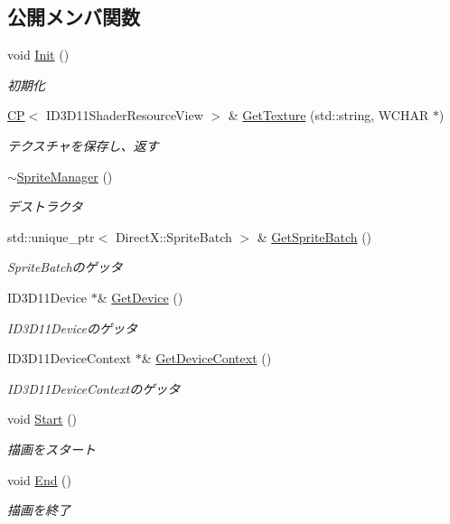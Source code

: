 \subsection*{公開メンバ関数}
\begin{DoxyCompactItemize}
\item 
void \mbox{\hyperlink{class_sprite_manager_a82941ce284548c762f250220ea58f43c}{Init}} ()
\begin{DoxyCompactList}\small\item\em 初期化 \end{DoxyCompactList}\item 
\mbox{\hyperlink{sprite__manager_8h_ab0deadee9fd38132a17560766af7fc45}{CP}}$<$ I\+D3\+D11\+Shader\+Resource\+View $>$ \& \mbox{\hyperlink{class_sprite_manager_abccd80013300704593a7bdc45aeeeb05}{Get\+Texture}} (std\+::string, W\+C\+H\+AR $\ast$)
\begin{DoxyCompactList}\small\item\em テクスチャを保存し、返す \end{DoxyCompactList}\item 
\mbox{\hyperlink{class_sprite_manager_ae01a31b1c80f676604ba55c93b499e1f}{$\sim$\+Sprite\+Manager}} ()
\begin{DoxyCompactList}\small\item\em デストラクタ \end{DoxyCompactList}\item 
std\+::unique\+\_\+ptr$<$ Direct\+X\+::\+Sprite\+Batch $>$ \& \mbox{\hyperlink{class_sprite_manager_a0b82bacf33d0b558657c8e9841daf9d9}{Get\+Sprite\+Batch}} ()
\begin{DoxyCompactList}\small\item\em Sprite\+Batchのゲッタ \end{DoxyCompactList}\item 
I\+D3\+D11\+Device $\ast$\& \mbox{\hyperlink{class_sprite_manager_ac9e2c44cc43775d9802612bd4be9bac3}{Get\+Device}} ()
\begin{DoxyCompactList}\small\item\em I\+D3\+D11\+Deviceのゲッタ \end{DoxyCompactList}\item 
I\+D3\+D11\+Device\+Context $\ast$\& \mbox{\hyperlink{class_sprite_manager_a6bad23e380818dbe6b521adc07ab84fa}{Get\+Device\+Context}} ()
\begin{DoxyCompactList}\small\item\em I\+D3\+D11\+Device\+Contextのゲッタ \end{DoxyCompactList}\item 
void \mbox{\hyperlink{class_sprite_manager_a6b387e8736713264f6d590082cd492cb}{Start}} ()
\begin{DoxyCompactList}\small\item\em 描画をスタート \end{DoxyCompactList}\item 
void \mbox{\hyperlink{class_sprite_manager_afed8a96a6530f67123a4efa1b6d77032}{End}} ()
\begin{DoxyCompactList}\small\item\em 描画を終了 \end{DoxyCompactList}\end{DoxyCompactItemize}
